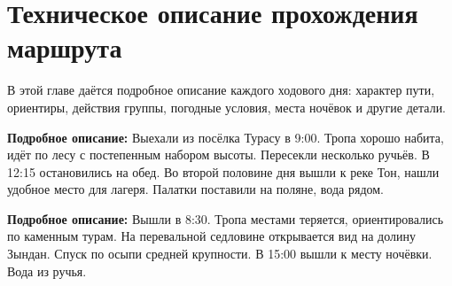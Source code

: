 \chapter{Техническое описание прохождения маршрута}
\label{ch:technical}

В этой главе даётся подробное описание каждого ходового дня: характер пути, ориентиры, действия группы, погодные условия, места ночёвок и другие детали.


\begin{tourinfotable}
\end{tourinfotable}

\textbf{Подробное описание:}
Выехали из посёлка Турасу в 9:00. Тропа хорошо набита, идёт по лесу с постепенным набором высоты. Пересекли несколько ручьёв. В 12:15 остановились на обед. Во второй половине дня вышли к реке Тон, нашли удобное место для лагеря. Палатки поставили на поляне, вода рядом.


\begin{tourinfotable}
\end{tourinfotable}

\textbf{Подробное описание:}
Вышли в 8:30. Тропа местами теряется, ориентировались по каменным турам. На перевальной седловине открывается вид на долину Зындан. Спуск по осыпи средней крупности. В 15:00 вышли к месту ночёвки. Вода из ручья.

